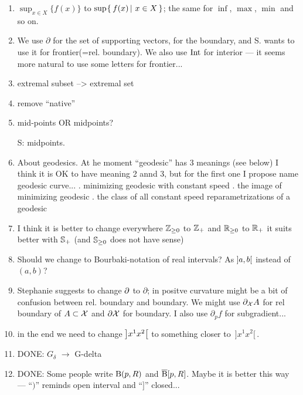 \begin{enumerate}
\item $\sup_{x\in X}\{f(x)\}$ to $\sup\set{f(x)}{x\in X}$;
the same for $\inf$, $\max$, $\min$ and so on.

\item We use $\partial$ for the set of supporting vectors, for the boundary, and S. wants to use it for frontier(=rel. boundary). We also use $\mathop{\rm Int}\nolimits$ for interior --- it seems more natural to use some letters for frontier...

\item extremal subset --> extremal set

\item remove ``native''

\item mid-points OR midpoints?  

S: midpoints.

\item About geodesics. At he moment ``geodesic'' has 3 meanings (see below) I think it is OK to have meaning 2 annd 3, but for the first one I propose name geodesic curve...
. minimizing geodesic with constant speed
. the image of minimizing geodesic
. the class of all constant speed reparametrizations of a geodesic 

\item I think it is better to change everywhere $\ZZ_{\ge0}$ to $\mathbb{Z}_+$ and $\RR_{\ge0}$ to $\mathbb{R}_+$ it suits better with $\mathbb{S}_+$ (and $\SS_{\ge0}$ does not have sense)

\item Should we change to Bourbaki-notation of real intervals? As $\hskip-0.1em\left]a,b\right[$ instead of $(a,b)$?

\item Stephanie suggests to change $\partial$ to $\partial$; in positve curvature might be  a bit of confusion between rel. boundary and boundary. We might use $\partial_{\mathcal{X}}A$ for rel boundary of $A\subset \spc{X}$ and $\partial\mathcal{X}$ for boundary. I also use $\partial_p f$ for subgradient...

\item in the end we need to change $\hskip-0.1em\left]x^1x^2\right[$ to something closer to 
$\,{]}x^1x^2{[}\,$.

\item DONE: $G_\delta$ $\to$ G-delta

\item DONE: Some people write $\mathrm{B}{}(p,R)$ and $\overline{\mathrm{B}}{}[p,R]$. 
Maybe it is better this way --- ``$)$'' reminds open interval and ``$]$'' closed...


\end{enumerate}
